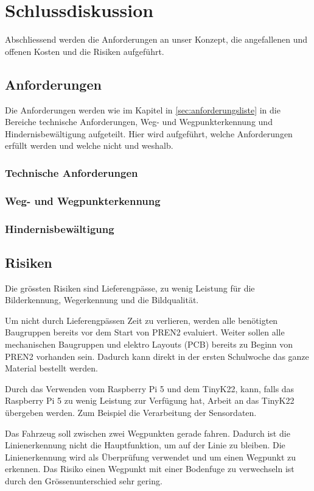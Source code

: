 \documentclass[../main.tex]{subfiles}
\begin{document}
\newpage
\section{Schlussdiskussion}

Abschliessend werden die Anforderungen an unser Konzept, die angefallenen und offenen Kosten und die Risiken aufgeführt. 
\subsection{Anforderungen}
Die Anforderungen werden wie im Kapitel in \ref{sec:anforderungsliste} in die Bereiche technische Anforderungen, Weg- und Wegpunkterkennung und Hindernisbewältigung aufgeteilt. Hier wird aufgeführt, welche Anforderungen erfüllt werden und welche nicht und weshalb.
\subsubsection{Technische Anforderungen}
\subsubsection{Weg- und Wegpunkterkennung}
\subsubsection{Hindernisbewältigung}
\subsection{Risiken}
Die grössten Risiken sind Lieferengpässe, zu wenig Leistung für die Bilderkennung, Wegerkennung und die Bildqualität. 

Um nicht durch Lieferengpässen Zeit zu verlieren, werden alle benötigten Baugruppen bereits vor dem Start von PREN2 evaluiert. Weiter sollen alle mechanischen Baugruppen und elektro Layouts (PCB) bereits zu Beginn von PREN2 vorhanden sein. Dadurch kann direkt in der ersten Schulwoche das ganze Material bestellt werden.

Durch das Verwenden vom Raspberry Pi 5 und dem TinyK22, kann, falls das Raspberry Pi 5 zu wenig Leistung zur Verfügung hat, Arbeit an das TinyK22 übergeben werden. Zum Beispiel die Verarbeitung der Sensordaten. 

Das Fahrzeug soll zwischen zwei Wegpunkten gerade fahren. Dadurch ist die Linienerkennung nicht die Hauptfunktion, um auf der Linie zu bleiben. Die Linienerkennung wird als Überprüfung verwendet und um einen Wegpunkt zu erkennen. Das Risiko einen Wegpunkt mit einer Bodenfuge zu verwechseln ist durch den Grössenunterschied sehr gering. 
\end{document}

